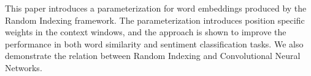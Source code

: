 This paper introduces a parameterization for word embeddings produced by the Random Indexing framework. The parameterization introduces position specific weights in the context windows, and the approach is shown to improve the performance in both word similarity and sentiment classification tasks. We also demonstrate the relation between Random Indexing and Convolutional Neural Networks.
